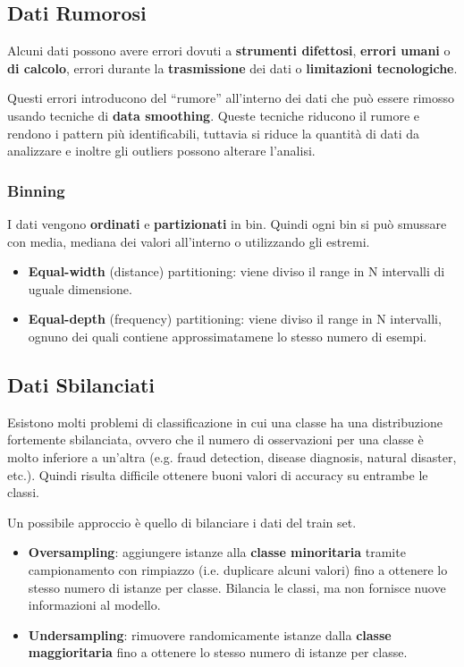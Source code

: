 \subsection*{Dati Rumorosi}
Alcuni dati possono avere errori dovuti a \textbf{strumenti difettosi}, \textbf{errori umani} o \textbf{di calcolo}, 
errori durante la \textbf{trasmissione} dei dati o \textbf{limitazioni tecnologiche}. 

Questi errori introducono del ``rumore'' all'interno dei dati che può essere rimosso usando tecniche di \textbf{data smoothing}.
Queste tecniche riducono il rumore e rendono i pattern più identificabili, tuttavia si riduce la quantità di dati da analizzare e inoltre gli outliers possono alterare l'analisi. 

\subsubsection*{Binning}
I dati vengono \textbf{ordinati} e \textbf{partizionati} in bin. Quindi ogni bin si può smussare con media, mediana dei valori all'interno o utilizzando gli estremi. 

\begin{itemize}
  \item \textbf{Equal-width} (distance) partitioning: viene diviso il range in N intervalli di uguale dimensione. 
  \item \textbf{Equal-depth} (frequency) partitioning: viene diviso il range in N intervalli, ognuno dei quali contiene approssimatamene lo stesso numero di esempi.
\end{itemize}


\subsection*{Dati Sbilanciati}
Esistono molti problemi di classificazione in cui una classe ha una distribuzione fortemente sbilanciata, ovvero che il numero di 
osservazioni per una classe è molto inferiore a un'altra  (e.g. fraud detection, disease diagnosis, natural disaster, etc.). 
Quindi risulta difficile ottenere buoni valori di accuracy su entrambe le classi.

Un possibile approccio è quello di bilanciare i dati del train set.
\begin{itemize}
  \item \textbf{Oversampling}: aggiungere istanze alla \textbf{classe minoritaria} tramite campionamento con rimpiazzo (i.e. duplicare alcuni valori) fino a ottenere lo stesso numero di istanze per classe.
  Bilancia le classi, ma non fornisce nuove informazioni al modello.
  \item \textbf{Undersampling}: rimuovere randomicamente istanze dalla \textbf{classe maggioritaria} fino a ottenere lo stesso numero di istanze per classe.
\end{itemize}

